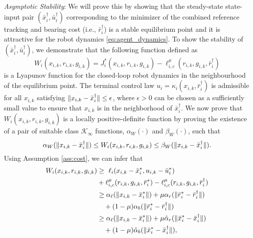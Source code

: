 \textit{Asymptotic Stability}: We will prove this by showing that the steady-state state-input pair $(\bar{x}_i^\dagger, \bar{u}_i^\dagger)$ corresponding to the minimizer of the combined reference tracking and bearing cost (i.e., $\bar{r}_i^\dagger$) is a stable equilibrium point and it is attractive for the robot dynamics \eqref{eq:agent_dynamics}. To show the stability of $(\bar{x}_i^\dagger, \bar{u}_i^\dagger)$, we demonstrate that the following function defined as
\begin{equation*}
      W_i(x_{i,k}, r_{i,k}, g_{i,k}) = J_i^*(x_{i,k}, r_{i,k}, g_{i,k})-\ell_{i,c}^\mu(r_{i,k},g_{i,k},\bar{r}_i^\dagger) 
\end{equation*}
is a Lyapunov function for the closed-loop robot dynamics in the neighbourhood of the equilibrium point.
The terminal control law $u_i = \kappa_i(x_{i,k}, \bar{r}_i^\dagger)$ is admissible for all $x_{i,k}$ satisfying $\lVert x_{i,k} - \bar{x}_i^\dagger\rVert\leq \epsilon$, where $\epsilon>0$ can be chosen as a sufficiently small value to ensure that $x_{i,k}$ is in the neighborhood of $\bar{x}_i^\dagger$.
We now prove that $W_i(x_{i,k}, r_{i,k}, g_{i,k})$ is a locally positive-definite function by proving the existence of a pair of suitable class $\mathcal{K}_\infty$ functions, $\alpha_W(\cdot)$ and $\beta_W(\cdot)$, such that 
\begin{equation*}
    \alpha_W(\lVert x_{i,k} - \bar{x}_i^\dagger\rVert) \leq W_i(x_{i,k}, r_{i,k}, g_{i,k}) \leq \beta_W(\lVert x_{i,k} - \bar{x}_i^\dagger\rVert).
\end{equation*}
Using Assumption \ref{ass:cost}, we can infer that
\begin{align}
    W_i(x_{i,k}, r_{i,k}, g_{i,k})&\geq  \ \ell_i({x_{i,k} - \bar{x}_i^*,u_{i,k} - \bar{u}_i^*}) \nonumber
    \\&+ \ell_{i,c}^\mu(r_{i,k},g_{i,k}, \bar{r}_i^*) - \ell_{i,c}^\mu(r_{i,k},g_{i,k},\bar{r}_i^\dagger) \nonumber
    \\&\geq \alpha_\ell(\lVert x_{i,k} - \bar{x}_i^*\rVert) + \mu \alpha_r(\lVert\bar{r}_i^* - \bar{r}_i^\dagger\rVert) \nonumber
    \\&\quad + (1-\mu)\alpha_b(\lVert\bar{r}_i^* - \bar{r}_i^\dagger\rVert)\nonumber 
    \\&\geq \alpha_\ell(\lVert x_{i,k} - \bar{x}_i^*\rVert) + \mu \hat{\alpha}_r(\lVert\bar{x}_i^* - \bar{x}_i^\dagger\rVert)\nonumber
    \\&\quad + (1-\mu)\hat{\alpha}_b(\lVert\bar{x}_i^* - \bar{x}_i^\dagger\rVert),\nonumber
\end{align}
